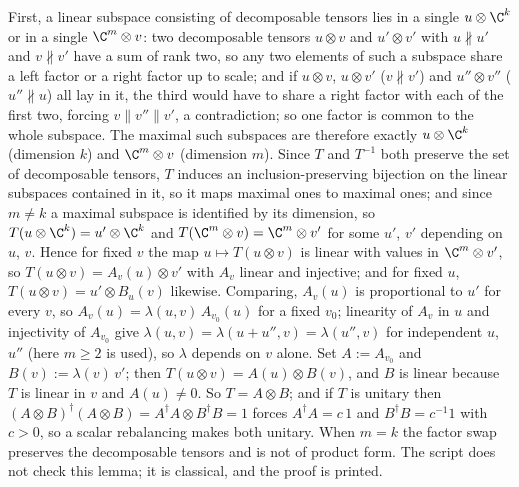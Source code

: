 First, a linear subspace consisting of decomposable tensors lies in a single $u \otimes \C^{k}$ or in a single $\C^{m} \otimes v$: two decomposable tensors $u \otimes v$ and $u' \otimes v'$ with $u \nparallel u'$ and $v \nparallel v'$ have a sum of rank two, so any two elements of such a subspace share a left factor or a right factor up to scale; and if $u \otimes v$, $u \otimes v'$ ($v \nparallel v'$) and $u'' \otimes v''$ ($u'' \nparallel u$) all lay in it, the third would have to share a right factor with each of the first two, forcing $v \parallel v''\parallel v'$, a contradiction; so one factor is common to the whole subspace. The maximal such subspaces are therefore exactly $u \otimes \C^{k}$ (dimension $k$) and $\C^{m} \otimes v$ (dimension $m$). Since $T$ and $T^{-1}$ both preserve the set of decomposable tensors, $T$ induces an inclusion-preserving bijection on the linear subspaces contained in it, so it maps maximal ones to maximal ones; and since $m \neq k$ a maximal subspace is identified by its dimension, so $T(u \otimes \C^{k}) = u' \otimes \C^{k}$ and $T(\C^{m} \otimes v) = \C^{m} \otimes v'$ for some $u'$, $v'$ depending on $u$, $v$. Hence for fixed $v$ the map $u \mapsto T(u \otimes v)$ is linear with values in $\C^{m} \otimes v'$, so $T(u \otimes v) = A_{v}(u) \otimes v'$ with $A_{v}$ linear and injective; and for fixed $u$, $T(u \otimes v) = u' \otimes B_{u}(v)$ likewise. Comparing, $A_{v}(u)$ is proportional to $u'$ for every $v$, so $A_{v}(u) = \lambda(u, v)\,A_{v_{0}}(u)$ for a fixed $v_{0}$; linearity of $A_{v}$ in $u$ and injectivity of $A_{v_{0}}$ give $\lambda(u, v) = \lambda(u + u'', v) = \lambda(u'', v)$ for independent $u$, $u''$ (here $m \ge 2$ is used), so $\lambda$ depends on $v$ alone. Set $A := A_{v_{0}}$ and $B(v) := \lambda(v)\,v'$; then $T(u \otimes v) = A(u) \otimes B(v)$, and $B$ is linear because $T$ is linear in $v$ and $A(u) \neq 0$. So $T = A \otimes B$; and if $T$ is unitary then $(A \otimes B)^{\dagger}(A \otimes B) = A^{\dagger}A \otimes B^{\dagger}B = 1$ forces $A^{\dagger}A = c\,1$ and $B^{\dagger}B = c^{-1}1$ with $c > 0$, so a scalar rebalancing makes both unitary. When $m = k$ the factor swap preserves the decomposable tensors and is not of product form. The script does not check this lemma; it is classical, and the proof is printed.
